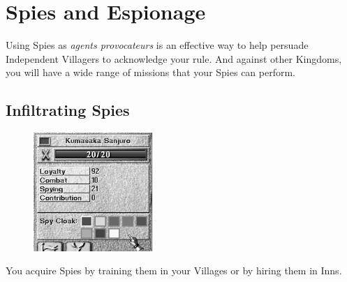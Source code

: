 
\chapter{Spies and Espionage}

Using Spies as \textit{agents provocateurs} is an effective way to help persuade Independent Villagers to acknowledge your rule. And against other Kingdoms, you will have a wide range of missions that your Spies can perform.

\section{Infiltrating Spies}

\begin{figure}
	\vspace{-20pt}
	\begin{center}
		\includegraphics[width=0.4\textwidth]{Ispyinfo}
	\end{center}
	\vspace{-20pt}
\end{figure}

You acquire Spies by training them in your Villages or by hiring them in Inns.

